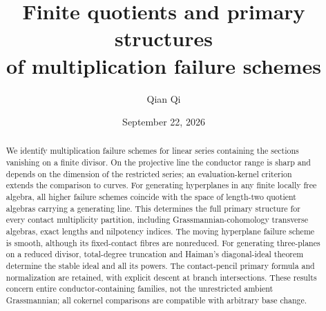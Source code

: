 \documentclass[11pt,reqno]{amsart}
\title[Finite quotients and multiplication failure]{Finite quotients and primary structures\\of multiplication failure schemes}
\author{Qian Qi}
\date{September 22, 2026}
\numberwithin{equation}{section}
\theoremstyle{definition}\newtheorem{definition}[theorem]{Definition}
\theoremstyle{remark}\newtheorem{remark}[theorem]{Remark}
\begin{document}
\begin{abstract}
We identify multiplication failure schemes for linear series containing the sections vanishing on a finite divisor. On the projective line the conductor range is sharp and depends on the dimension of the restricted series; an evaluation-kernel criterion extends the comparison to curves. For generating hyperplanes in any finite locally free algebra, all higher failure schemes coincide with the space of length-two quotient algebras carrying a generating line. This determines the full primary structure for every contact multiplicity partition, including Grassmannian-cohomology transverse algebras, exact lengths and nilpotency indices. The moving hyperplane failure scheme is smooth, although its fixed-contact fibres are nonreduced. For generating three-planes on a reduced divisor, total-degree truncation and Haiman's diagonal-ideal theorem determine the stable ideal and all its powers. The contact-pencil primary formula and normalization are retained, with explicit descent at branch intersections. These results concern entire conductor-containing families, not the unrestricted ambient Grassmannian; all cokernel comparisons are compatible with arbitrary base change.
\end{abstract}
\maketitle










\end{document}
